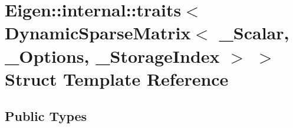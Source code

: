 \hypertarget{struct_eigen_1_1internal_1_1traits_3_01_dynamic_sparse_matrix_3_01___scalar_00_01___options_00_01___storage_index_01_4_01_4}{}\section{Eigen\+:\+:internal\+:\+:traits$<$ Dynamic\+Sparse\+Matrix$<$ \+\_\+\+Scalar, \+\_\+\+Options, \+\_\+\+Storage\+Index $>$ $>$ Struct Template Reference}
\label{struct_eigen_1_1internal_1_1traits_3_01_dynamic_sparse_matrix_3_01___scalar_00_01___options_00_01___storage_index_01_4_01_4}
\subsection*{Public Types}
